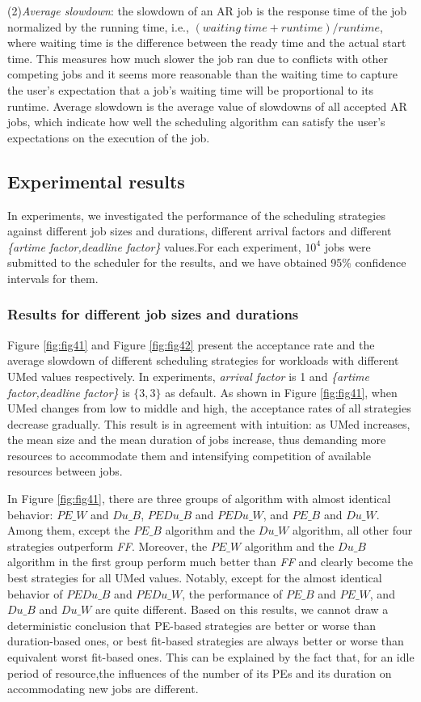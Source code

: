 \documentclass[preprint,12pt]{elsarticle}
\begin{document}
(2)\emph{Average slowdown}: the slowdown of an AR job is the response time of the job normalized by the running time, i.e., $(waiting\; time +runtime)/runtime$, where waiting time is the difference between the ready time and the actual start time. This measures how much slower the job ran due to conflicts with other competing jobs and it seems more reasonable than the waiting time to capture the user's expectation that a job's waiting time will be proportional to its runtime. Average slowdown is the average value of slowdowns of all accepted AR jobs, which indicate how well the scheduling algorithm can satisfy the user's expectations on the execution of the job.


\subsection{Experimental results}
\label{results}
In experiments, we investigated the performance of the scheduling strategies against different job sizes and durations, different arrival factors and different \emph{\{artime factor,deadline factor\}} values.For each experiment, $10^4$ jobs were submitted to the scheduler for the results, and we have obtained 95\% confidence intervals for them.

\subsubsection{Results for different job sizes and durations}

Figure \ref{fig:fig41} and Figure \ref{fig:fig42} present the acceptance rate and the average slowdown of different scheduling strategies for workloads with different UMed values respectively. In experiments, \emph{arrival factor} is 1 and  \emph{\{artime factor,deadline factor\}} is $\{3,3\}$ as default. As shown in Figure \ref{fig:fig41}, when UMed changes from low to middle and high, the acceptance rates of all strategies decrease gradually. This result is in agreement with intuition: as UMed increases, the mean size and the mean duration of jobs increase, thus demanding more resources to accommodate them and intensifying competition of available resources between jobs.

In Figure \ref{fig:fig41}, there are three groups of algorithm with almost identical behavior: $PE\_W$ and $Du\_B$, $PEDu\_B$ and $PEDu\_W$, and $PE\_B$ and $Du\_W$. Among them, except the $PE\_B$ algorithm and the $Du\_W$ algorithm, all other four strategies outperform \emph{FF}. Moreover, the $PE\_W$ algorithm and the $Du\_B$ algorithm in the first group perform much better than \emph{FF} and clearly become the best strategies for all UMed values. Notably, except for the almost identical behavior of $PEDu\_B$ and $PEDu\_W$, the performance of $PE\_B$ and $PE\_W$, and $Du\_B$ and $Du\_W$ are quite different. Based on this results, we cannot draw a deterministic conclusion that PE-based strategies are better or worse than duration-based ones, or best fit-based strategies are always better or worse than equivalent worst fit-based ones. This can be explained by the fact that, for an idle period of resource,the influences of the number of its PEs and its duration on accommodating new jobs are different.
\end{document}
